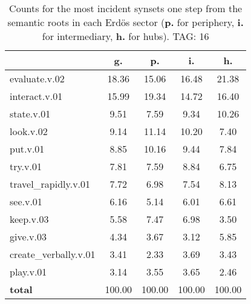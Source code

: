\begin{table}[h!]
\begin{center}
\begin{tabular}{| l | c | c | c | c |}\hline
 & g. & p. & i. & h. \\\hline
evaluate.v.02 & 18.36  & 15.06  & 16.48  & 21.38 \\\hline
interact.v.01 & 15.99  & 19.34  & 14.72  & 16.40 \\\hline
state.v.01 & 9.51  & 7.59  & 9.34  & 10.26 \\\hline
look.v.02 & 9.14  & 11.14  & 10.20  & 7.40 \\\hline
put.v.01 & 8.85  & 10.16  & 9.44  & 7.84 \\\hline
try.v.01 & 7.81  & 7.59  & 8.84  & 6.75 \\\hline
travel\_rapidly.v.01 & 7.72  & 6.98  & 7.54  & 8.13 \\\hline
see.v.01 & 6.16  & 5.14  & 6.01  & 6.61 \\\hline
keep.v.03 & 5.58  & 7.47  & 6.98  & 3.50 \\\hline
give.v.03 & 4.34  & 3.67  & 3.12  & 5.85 \\\hline
create\_verbally.v.01 & 3.41  & 2.33  & 3.69  & 3.43 \\\hline
play.v.01 & 3.14  & 3.55  & 3.65  & 2.46 \\\hline
{{\bf total}} & 100.00  & 100.00  & 100.00  & 100.00 \\\hline
\end{tabular}
\caption{Counts for the most incident synsets one step from the semantic roots in each Erd\"os sector ({\bf p.} for periphery, {\bf i.} for intermediary, {\bf h.} for hubs). TAG: 16}
\end{center}
\end{table}